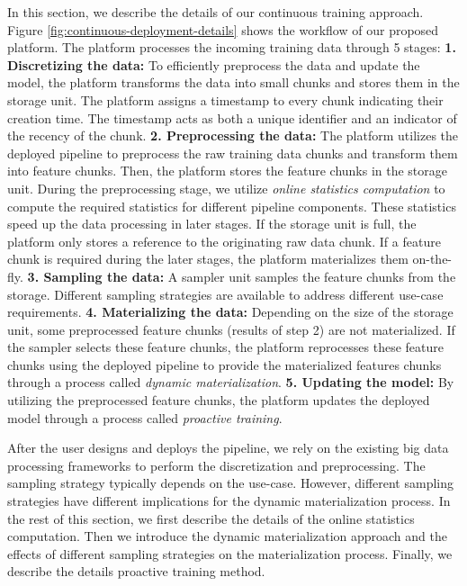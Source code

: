 In this section, we describe the details of our continuous training approach.
Figure \ref{fig:continuous-deployment-details} shows the workflow of our proposed platform.
The platform processes the incoming training data through 5 stages:\newline
\textbf{1. Discretizing the data: } 
To efficiently preprocess the data and update the model, the platform transforms the data into small chunks and stores them in the storage unit. 
The platform assigns a timestamp to every chunk indicating their creation time.
The timestamp acts as both a unique identifier and an indicator of the recency of the chunk.\newline
\textbf{2. Preprocessing the data: } 
The platform utilizes the deployed pipeline to preprocess the raw training data chunks and transform them into feature chunks.
Then, the platform stores the feature chunks in the storage unit.
During the preprocessing stage, we utilize \textit{online statistics computation} to compute the required statistics for different pipeline components.
These statistics speed up the data processing in later stages.
If the storage unit is full, the platform only stores a reference to the originating raw data chunk.
If a feature chunk is required during the later stages, the platform materializes them on-the-fly. \newline
\textbf{3. Sampling the data: }
A sampler unit samples the feature chunks from the storage.
Different sampling strategies are available to address different use-case requirements.\newline
\textbf{4. Materializing the data: }
Depending on the size of the storage unit, some preprocessed feature chunks (results of step 2) are not materialized.
If the sampler selects these feature chunks, the platform reprocesses these feature chunks using the deployed pipeline to provide the materialized features chunks through a process called \textit{dynamic materialization}.\newline
\textbf{5. Updating the model: }
By utilizing the preprocessed feature chunks, the platform updates the deployed model through a process called \textit{proactive training}.\newline

After the user designs and deploys the pipeline, we rely on the existing big data processing frameworks to perform the discretization and preprocessing.
The sampling strategy typically depends on the use-case.
However, different sampling strategies have different implications for the dynamic materialization process.
In the rest of this section, we first describe the details of the online statistics computation.
Then we introduce the dynamic materialization approach and the effects of different sampling strategies on the materialization process.
Finally, we describe the details proactive training method.

